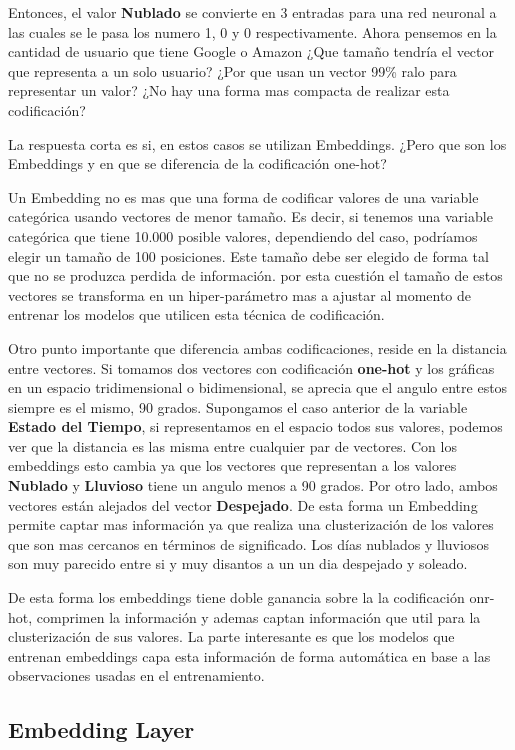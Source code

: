 \documentclass[11pt,a4paper,twoside]{thesis}
\begin{document}
Entonces, el valor \textbf{Nublado} se convierte en 3 entradas para una red neuronal a las cuales se le pasa los numero 1, 0 y 0 respectivamente. Ahora pensemos en la cantidad de usuario que tiene Google o Amazon ¿Que tamaño tendría el vector que representa a un solo usuario? ¿Por que usan un vector 99\% ralo para representar un valor? ¿No hay una forma mas compacta de realizar esta codificación? 

La respuesta corta es si, en estos casos se utilizan Embeddings. ¿Pero que son los Embeddings y en que se diferencia de la codificación one-hot?

Un Embedding no es mas que una forma de codificar valores de una variable categórica usando vectores de menor tamaño. Es decir, si tenemos una variable categórica
que tiene 10.000 posible valores, dependiendo del caso, podríamos elegir un tamaño de 100 posiciones. Este tamaño debe ser elegido de forma tal que no se produzca
perdida de información. por esta cuestión el tamaño de estos vectores se transforma en un hiper-parámetro mas a ajustar al momento de entrenar los modelos que utilicen esta técnica de codificación.

Otro punto importante que diferencia ambas codificaciones, reside en la distancia entre vectores. Si tomamos dos vectores con codificación \textbf{one-hot} y los gráficas en un espacio tridimensional o bidimensional, se aprecia que el angulo entre estos siempre es el mismo, 90 grados. Supongamos el caso anterior de la variable \textbf{Estado del Tiempo}, si representamos en el espacio todos sus valores, podemos ver que la distancia es las misma entre cualquier par de vectores.
Con los embeddings esto cambia  ya que los vectores que representan a los valores \textbf{Nublado} y \textbf{Lluvioso} tiene un angulo menos a 90 grados. Por otro lado, ambos vectores están alejados del vector \textbf{Despejado}. De esta forma un Embedding permite captar mas información ya que realiza una clusterización de los valores que son mas cercanos en términos de significado. Los días nublados y lluviosos son muy parecido entre si y muy disantos a un un dia despejado y soleado.

De esta forma los embeddings tiene doble ganancia sobre la la codificación onr-hot, comprimen la información y ademas  captan información que util para la clusterización de sus valores. La parte interesante es que los modelos que entrenan embeddings capa esta información de forma automática en base a las observaciones usadas en el entrenamiento.


\subsection{Embedding Layer}
\end{document}
